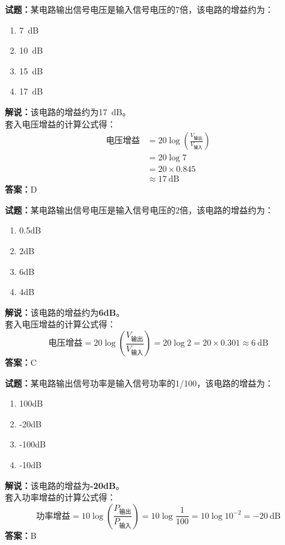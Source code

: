 \documentclass{ctexbook}
\begin{document}
\textbf{试题：}某电路输出信号电压是输入信号电压的7倍，该电路的增益约为：
\begin{enumerate}[leftmargin=3em]
  \item \SI{7}{\dB}
  \item \SI{10}{\dB}
  \item \SI{15}{\dB}
  \item \SI{17}{\dB}  %
\end{enumerate}
\noindent\textbf{解说：}该电路的增益约为\SI{17}{\dB}。\\
套入电压增益的计算公式得：
\begin{equation*}
  \begin{aligned}
    \mbox{电压增益} & =20 \log \left( {\frac{V_{ \mbox{输出} }}{V_{ \mbox{输入} }}} \right) \\
                & = 20 \log 7                                                       \\
                & = 20\times 0.845                                                  \\
                & \approx \SI{17}{\dB}
  \end{aligned}
\end{equation*}
\noindent\textbf{答案：}D

\vspace{1em}

\textbf{试题：}某电路输出信号电压是输入信号电压的2倍，该电路的增益约为：
\begin{enumerate}[leftmargin=3em]
  \item 0.5dB
  \item 2dB
  \item 6dB
  \item 4dB
\end{enumerate}
\noindent\textbf{解说：}该电路的增益约为\textbf{6dB}。\\
套入电压增益的计算公式得：
$$\mbox{电压增益}=20 \log \left( {\frac{V_{ \mbox{输出} }}{V_{ \mbox{输入} }}} \right)=20 \log 2 = 20 \times 0.301 \approx 6 \ \mathrm{dB}$$
\noindent\textbf{答案：}C

\vspace{1em}

\textbf{试题：}某电路输出信号功率是输入信号功率的1/100，该电路的增益为：
\begin{enumerate}[leftmargin=3em]
  \item 100dB
  \item -20dB
  \item -100dB
  \item -10dB
\end{enumerate}
\noindent\textbf{解说：}该电路的增益为\textbf{-20dB}。\\
套入功率增益的计算公式得：
$$\mbox{功率增益}=10 \log \left( {\frac{P_{ \mbox{输出} }}{P_{ \mbox{输入} }}} \right)=10 \log \frac{1}{100}=10 \log 10^{-2}=-20 \ \mathrm{dB}$$
\noindent\textbf{答案：}B
\end{document}
